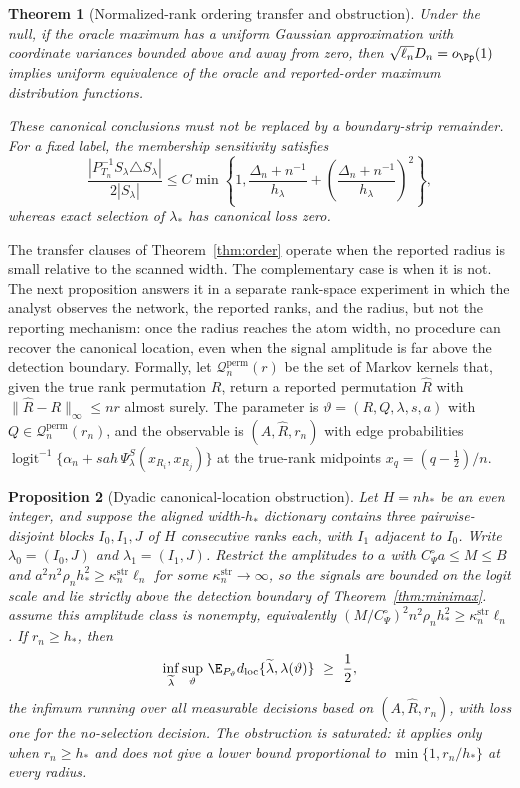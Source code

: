 \documentclass[11pt]{article}
\newtheorem{theorem}{Theorem}[section]
\newtheorem{proposition}[theorem]{Proposition}
\theoremstyle{definition}
\newcommand{\1}{\mathbf 1}\newcommand{\op}{\operatorname}
\begin{document}
\begin{theorem}[Normalized-rank ordering transfer and obstruction]
Under the null, if the oracle maximum has a uniform Gaussian approximation with
coordinate variances bounded above and away from zero, then
$\sqrt{\ell_n}D_n=o_\Pp(1)$ implies uniform equivalence of the oracle and
reported-order maximum distribution functions.

These canonical conclusions must not be replaced by a boundary-strip remainder.
For a fixed label, the membership sensitivity satisfies
\[
 \frac{|P_{T_n}^{-1}S_\lambda\triangle S_\lambda|}{2|S_\lambda|}
 \le C\min\left\{1,
 \frac{\Delta_n+n^{-1}}{h_\lambda}
 +\left(\frac{\Delta_n+n^{-1}}{h_\lambda}\right)^2\right\},
\]
whereas exact selection of $\lambda_*$ has canonical loss zero.
\end{theorem}

The transfer clauses of Theorem~\ref{thm:order} operate when the reported radius is
small relative to the scanned width.  The complementary case is
when it is not.  The next proposition answers it in a separate rank-space
experiment in which the analyst observes the network, the reported ranks, and the
radius, but not the reporting mechanism: once the radius reaches the atom width,
no procedure can recover the canonical location, even when the signal amplitude is
far above the detection boundary.  Formally, let
$\mathcal Q_n^{\mathrm{perm}}(r)$ be the set of Markov kernels that, given the
true rank permutation $R$, return a reported permutation $\widehat R$ with
$\|\widehat R-R\|_\infty\le nr$ almost surely.  The parameter is
$\vartheta=(R,Q,\lambda,s,a)$ with $Q\in\mathcal Q_n^{\mathrm{perm}}(r_n)$, and
the observable is $(A,\widehat R,r_n)$ with edge probabilities
$\operatorname{logit}^{-1}\{\alpha_n+sah\,\Psi_\lambda^S(x_{R_i},x_{R_j})\}$ at
the true-rank midpoints $x_q=(q-\tfrac12)/n$.

\begin{proposition}[Dyadic canonical-location obstruction]
\label{app:prop-obstruct}
Let $H=nh_*$ be an even integer, and suppose the aligned width-$h_*$ dictionary
contains three pairwise-disjoint blocks $I_0,I_1,J$ of $H$ consecutive ranks each,
with $I_1$ adjacent to $I_0$.  Write $\lambda_0=(I_0,J)$ and $\lambda_1=(I_1,J)$.
Restrict the amplitudes to $a$ with $C_\Psi^\circ a\le M\le B$ and
$a^2n^2\rho_nh_*^2\ge\kappa_n^{\mathrm{str}}\ell_n$ for some
$\kappa_n^{\mathrm{str}}\to\infty$, so the signals are bounded on the logit scale
and lie strictly above the detection boundary of Theorem~\ref{thm:minimax}.
assume this amplitude class is nonempty, equivalently
$(M/C_\Psi^\circ)^2n^2\rho_nh_*^2\ge\kappa_n^{\mathrm{str}}\ell_n$.  If
$r_n\ge h_*$, then
\[
 \inf_{\widetilde\lambda}
 \sup_{\vartheta}\,\E_{P_\vartheta}
 d_{\rm loc}\{\widetilde\lambda,\lambda(\vartheta)\}\ \ge\ \frac12,
\]
the infimum running over all measurable decisions based on
$(A,\widehat R,r_n)$, with loss one for the no-selection decision.  The
obstruction is saturated: it applies only when $r_n\ge h_*$ and does not give a
lower bound proportional to $\min\{1,r_n/h_*\}$ at every radius.
\end{proposition}
\end{document}
